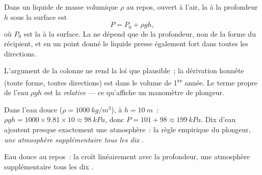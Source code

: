 \begin{theorem}\label{thm:g10:pressure:depth}
Dans un liquide de masse volumique $\rho$ au repos, ouvert à l'air, la
 à la profondeur $h$ sous la surface est
\[
P = P_0 + \rho g h,
\]
où $P_0$ est la  à la surface. La
 ne dépend que de la profondeur, non de la forme du
récipient, et en un point donné le liquide presse également fort dans
toutes les directions.
\end{theorem}
\admitted

\begin{remark}
L'argument de la colonne ne rend la loi que plausible~; la dérivation
honnête (toute forme, toutes directions) est dans le volume de
1\textsuperscript{re} année. Le terme propre de l'eau $\rho g h$ est la
 \emph{relative} --- ce qu'affiche
un manomètre de plongeur.
\end{remark}

\begin{example}\label{ex:g10:pressure:tenmetres}
Dans l'eau douce ($\rho = \qty{1000}{kg/m^3}$), à $h = \qty{10}{m}$~:
$\rho g h = 1000 \times 9.81 \times 10 \approx \qty{98}{kPa}$, donc
$P = 101 + 98 \approx \qty{199}{kPa}$. Dix
 d'eau ajoutent presque exactement une
atmosphère~: la règle empirique du plongeur, \emph{une atmosphère
supplémentaire tous les dix }.
\end{example}

\begin{omfigure}

{\small Eau douce au repos~: la  croît linéairement avec
la profondeur, une atmosphère supplémentaire tous les dix
.}
\end{omfigure}

